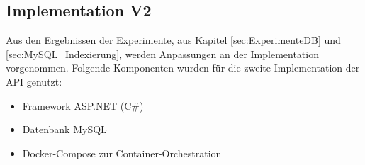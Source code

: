 \subsection{Implementation V2} \label{sec:Implementation2}
    Aus den Ergebnissen der Experimente, aus Kapitel \ref{sec:ExperimenteDB} und \ref{sec:MySQL_Indexierung}, werden Anpassungen an der Implementation vorgenommen.
    Folgende Komponenten wurden für die zweite Implementation der \ac{API} genutzt:
    \begin{itemize}
        \item Framework ASP.NET (C\#)
        \item Datenbank MySQL
        \item Docker-Compose zur Container-Orchestration
    \end{itemize}

